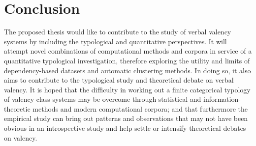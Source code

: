 \section{Conclusion}\label{sec:conclusion}

The proposed thesis would like to contribute to the study of verbal valency systems by including the typological and quantitative perspectives. It will attempt novel combinations of computational methods and corpora in service of a quantitative typological investigation, therefore exploring the utility and limits of dependency-based datasets and automatic clustering methods. In doing so, it also aims to contribute to the typological study and theoretical debate on verbal valency. It is hoped that the difficulty in working out a finite categorical typology of valency class systems may be overcome through statistical and information-theoretic methods and modern computational corpora; and that furthermore the empirical study can bring out patterns and observations that may not have been obvious in an introspective study and help settle or intensify theoretical debates on valency.

